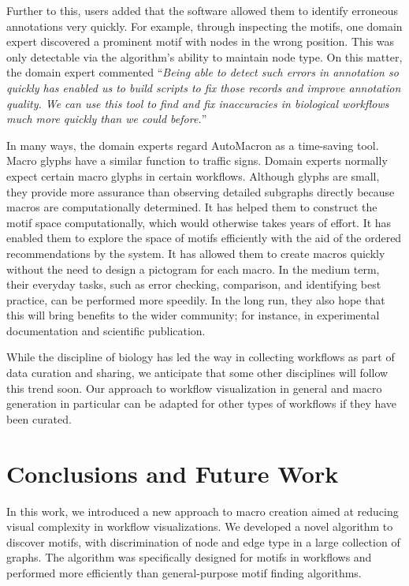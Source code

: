 \vspace{-1mm}
Further to this, users added that the software allowed them to identify erroneous annotations very quickly.
For example, through inspecting the motifs, one domain expert discovered a prominent motif with nodes in the wrong position.
This was only detectable via the algorithm's ability to maintain node type.
On this matter, the domain expert commented ``\emph{Being able to detect such errors in annotation so quickly has enabled us to build scripts to fix those records and improve annotation quality. We can use this tool to find and fix inaccuracies in biological workflows much more quickly than we could before.}'' 

In many ways, the domain experts regard AutoMacron as a time-saving tool.
Macro glyphs have a similar function to traffic signs.
Domain experts normally expect certain macro glyphs in certain workflows.
Although glyphs are small, they provide more assurance than observing detailed subgraphs directly because macros are computationally determined.
It has helped them to construct the motif space computationally, which would otherwise takes years of effort.
It has enabled them to explore the space of motifs efficiently with the aid of the ordered recommendations by the system.
It has allowed them to create macros quickly without the need to design a pictogram for each macro.
In the medium term, their everyday tasks, such as error checking, comparison, and identifying best practice, can be performed more speedily.
In the long run, they also hope that this will bring benefits to the wider community; for instance, in experimental documentation and scientific publication.

While the discipline of biology has led the way in collecting workflows as part of data curation and sharing, we anticipate that some other disciplines will follow this trend soon.
Our approach to workflow visualization in general and macro generation in particular can be adapted for other types of workflows if they have been curated.
 
\section{Conclusions and Future Work}

In this work, we introduced a new approach to macro creation aimed at reducing visual complexity in workflow visualizations. We developed a novel algorithm to discover motifs, with discrimination of node and edge type in a large collection of graphs. The algorithm was specifically designed for motifs in workflows and performed more efficiently than general-purpose motif finding algorithms. 

